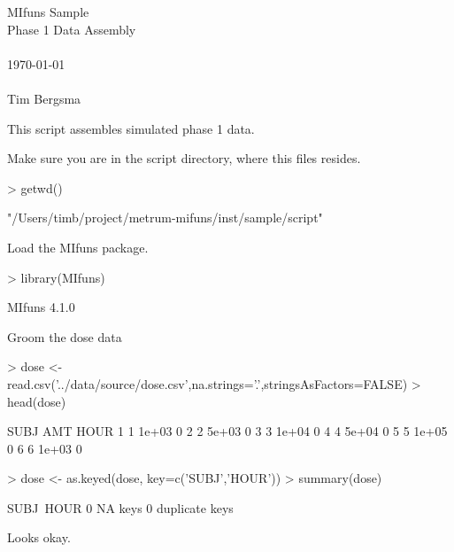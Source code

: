 
\usepackage{Sweave}

 

\vspace*{2cm}
\begin{center}
{\Large MIfuns Sample}\\
\vspace{1.5cm}
{\Large Phase 1 Data Assembly}\\
~\\
\today\\
~\\
Tim Bergsma\\
\end{center}
\newpage

This script assembles simulated phase 1 data.

Make sure you are in the script directory, where this files resides.
\begin{Schunk}
\begin{Sinput}
> getwd()
\end{Sinput}
\begin{Soutput}
[1] "/Users/timb/project/metrum-mifuns/inst/sample/script"
\end{Soutput}
\end{Schunk}
Load the MIfuns package.
\begin{Schunk}
\begin{Sinput}
> library(MIfuns)
\end{Sinput}
\begin{Soutput}
MIfuns 4.1.0 
\end{Soutput}
\end{Schunk}
Groom the dose data
\begin{Schunk}
\begin{Sinput}
> dose <- read.csv('../data/source/dose.csv',na.strings='.',stringsAsFactors=FALSE)
> head(dose)
\end{Sinput}
\begin{Soutput}
  SUBJ   AMT HOUR
1    1 1e+03    0
2    2 5e+03    0
3    3 1e+04    0
4    4 5e+04    0
5    5 1e+05    0
6    6 1e+03    0
\end{Soutput}
\begin{Sinput}
> dose <- as.keyed(dose, key=c('SUBJ','HOUR'))
> summary(dose)
\end{Sinput}
\begin{Soutput}
SUBJ~HOUR
0 NA keys
0 duplicate keys
\end{Soutput}
\end{Schunk}
Looks okay.

